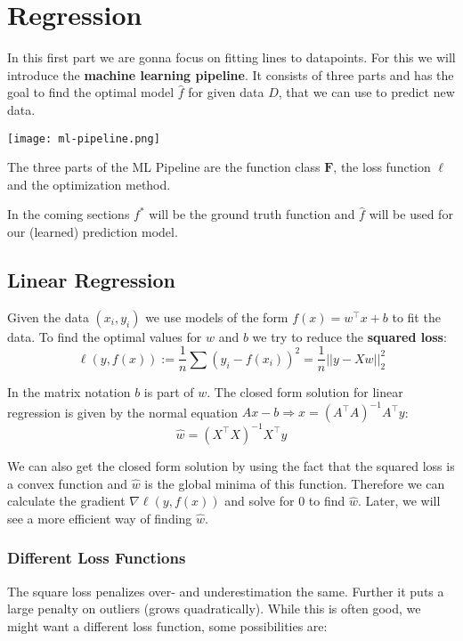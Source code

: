 \section{Regression}

In this first part we are gonna focus on fitting lines to datapoints. For this we will introduce the \textbf{machine learning pipeline}. It consists of three parts and has the goal to find the optimal model $\hat{f}$ for given data $D$, that we can use to predict new data.

\smallskip
\texttt{[image: ml-pipeline.png]}

The three parts of the ML Pipeline are the function class $\mathbf{F}$, the loss function $\ell$ and the optimization method. \medskip

In the coming sections $f^*$ will be the ground truth function and $\hat f$ will be used for our (learned) prediction model.

\subsection{Linear Regression}

Given the data $(x_i, y_i)$ we use models of the form $f(x) = w^\top x + b$ to fit the data. To find the optimal values for $w$ and $b$ we try to reduce the \textbf{squared loss}:
$$\ell(y, f(x)) := \frac{1}{n}\sum (y_i - f(x_i))^2 = \frac{1}{n}||y - X w||_2^2$$

In the matrix notation $b$ is part of $w$. The closed form solution for linear regression is given by the normal equation $Ax - b \Rightarrow x = (A^\top A)^{-1} A^\top y$:
$$\hat{w} = (X^\top X)^{-1}X^\top y$$

We can also get the closed form solution by using the fact that the squared loss is a convex function and $\hat{w}$ is the global minima of this function. Therefore we can calculate the gradient $\nabla \ell(y, f(x))$ and solve for $0$ to find $\hat{w}$. Later, we will see a more efficient way of finding $\hat{w}$. \medskip

\subsubsection{Different Loss Functions}

The square loss penalizes over- and underestimation the same. Further it puts a large penalty on outliers (grows quadratically). While this is often good, we might want a different loss function, some possibilities are:


